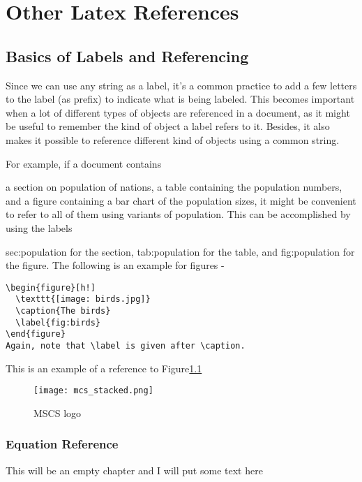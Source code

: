 \clearpage %

\chapter{Other Latex References}\label{CH3_AIM1}


\section{Basics of Labels and Referencing}

Since we can use any string as a label, it's a common practice to add a few letters to the label (as prefix) to indicate what is being labeled. This becomes important when a lot of different types of objects are referenced in a document, as it might be useful to remember the kind of object a label refers to it. Besides, it also makes it possible to reference different kind of objects using a common string.

For example, if a document contains

a section on population of nations,
a table containing the population numbers, and
a figure containing a bar chart of the population sizes,
it might be convenient to refer to all of them using variants of population. This can be accomplished by using the labels

sec:population for the section,
tab:population for the table, and
fig:population for the figure.
The following is an example for figures -

\begin{verbatim}
\begin{figure}[h!]
  \texttt{[image: birds.jpg]}
  \caption{The birds}
  \label{fig:birds}
\end{figure}
Again, note that \label is given after \caption.
\end{verbatim}

 This is an example of a reference to Figure\ref{fig:logo}


\begin{figure}[h]
\centering
\texttt{[image: mcs\_stacked.png]}
 \caption{MSCS logo}
 \label{fig:logo}
\end{figure}

\subsection{Equation Reference}
This will be an empty chapter and I will put some text here

